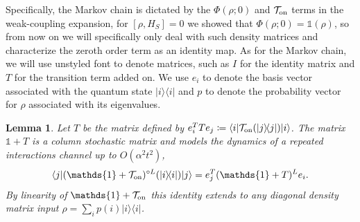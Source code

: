 \documentclass{article}
\newtheorem{lemma}[theorem]{Lemma}
\newcommand{\on}{\rm on}
\newcommand{\ket}[1]{|#1\rangle}
\newcommand{\bra}[1]{\langle #1|}
\newcommand{\ketbra}[2]{| #1\rangle\! \langle #2|}
\newcommand{\bigo}[1]{O\left(#1\right)}
\newcommand{\identity}{\mathds{1}}
\begin{document}
Specifically, the Markov chain is dictated by the $\Phi(\rho; 0)$ and $\mathcal{T}_{\on}$ terms in the weak-coupling expansion, for $[\rho, H_S] = 0$ we showed that $\Phi(\rho; 0) = \identity(\rho)$, so from now on we will specifically only deal with such density matrices and characterize the zeroth order term as an identity map. As for the Markov chain, we will use unstyled font to denote matrices, such as $I$ for the identity matrix and $T$ for the transition term added on. We use $e_i$ to denote the basis vector associated with the quantum state $\ketbra{i}{i}$ and $p$ to denote the probability vector for $\rho$ associated with its eigenvalues.
\begin{lemma} \label{lem:quantum_to_classical}
    Let $T$ be the matrix defined by $e_i^T T e_j \coloneqq \bra{i} \mathcal{T}_{\on}(\ketbra{j}{j}) \ket{i}$. The matrix $\identity + T$ is a column stochastic matrix and models the dynamics of a repeated interactions channel up to $\bigo{\alpha^2 t^2}$,
    \begin{equation}
        \bra{j} (\identity + \mathcal{T}_{\on})^{\circ L} (\ketbra{i}{i}) \ket{j} = e_j^T (\identity + T)^L e_i.
    \end{equation}
    By linearity of $\identity + \mathcal{T}_{\on}$ this identity extends to any diagonal density matrix input $\rho = \sum_i p(i) \ketbra{i}{i}$.
\end{lemma}
\end{document}
